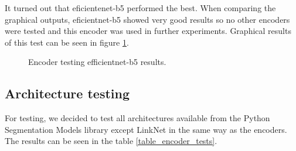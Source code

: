 \documentclass[12pt]{article}
\begin{document}
It turned out that eficientenet-b5 performed the best.
When comparing the graphical outputs, eficientnet-b5 showed very good results so no other encoders were tested and this encoder was used in further experiments. Graphical results of this test can be seen in figure \ref{figure_encoder_tests}. 

\begin{figure}[h]
    \centering
    \caption{Encoder testing efficientnet-b5 results.}
    \label{figure_encoder_tests}
\end{figure}

\subsection{Architecture testing}

For testing, we decided to test all architectures available from the Python Segmentation Models library except LinkNet in the same way as the encoders. The results can be seen in the table \ref{table_encoder_tests}.
\end{document}
